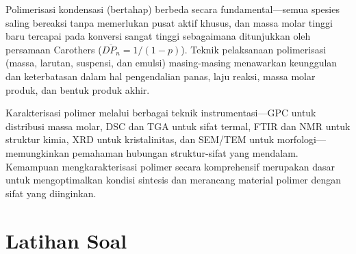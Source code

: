 \documentclass[12pt,a4paper,openany]{book}
\begin{document}
Polimerisasi kondensasi (bertahap) berbeda secara fundamental---semua spesies saling bereaksi tanpa memerlukan pusat aktif khusus, dan massa molar tinggi baru tercapai pada konversi sangat tinggi sebagaimana ditunjukkan oleh persamaan Carothers ($\overline{DP_n} = 1/(1-p)$). Teknik pelaksanaan polimerisasi (massa, larutan, suspensi, dan emulsi) masing-masing menawarkan keunggulan dan keterbatasan dalam hal pengendalian panas, laju reaksi, massa molar produk, dan bentuk produk akhir.

Karakterisasi polimer melalui berbagai teknik instrumentasi---GPC untuk distribusi massa molar, DSC dan TGA untuk sifat termal, FTIR dan NMR untuk struktur kimia, XRD untuk kristalinitas, dan SEM/TEM untuk morfologi---memungkinkan pemahaman hubungan struktur-sifat yang mendalam. Kemampuan mengkarakterisasi polimer secara komprehensif merupakan dasar untuk mengoptimalkan kondisi sintesis dan merancang material polimer dengan sifat yang diinginkan.


\section{Latihan Soal}
\end{document}
